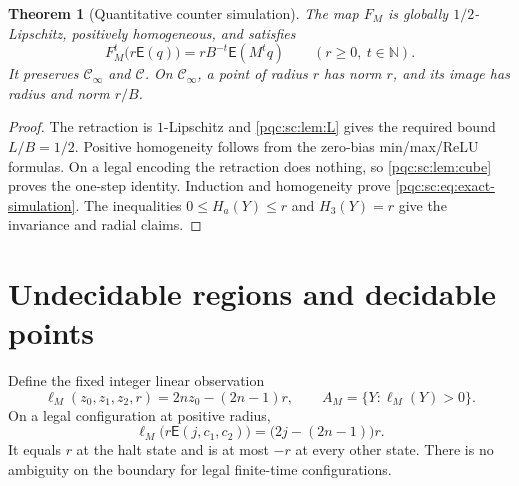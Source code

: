 \documentclass[11pt,letterpaper]{article}
\numberwithin{equation}{section}
\newtheorem{theorem}{Theorem}[section]
\theoremstyle{definition}
\theoremstyle{remark}
\newcommand{\N}{\mathbb N}
\newcommand{\srcmark}[1]{\par\noindent{\small\itshape [source~#1]}\par}
\newcommand{\Cone}{\mathcal C}
\newcommand{\Cinf}{\mathcal C_{\infty}}
\newcommand{\Enc}{\mathsf E}
\begin{document}
\begin{theorem}[Quantitative counter simulation]\label{pqc:sc:thm:counter}
The map $F_M$ is globally $1/2$-Lipschitz, positively homogeneous, and
satisfies
\begin{equation}\label{pqc:sc:eq:exact-simulation}
 F_M^t\bigl(r\Enc(q)\bigr)=rB^{-t}\Enc(M^tq)
 \qquad(r\ge0,\ t\in\N).
\end{equation}
It preserves $\Cinf$ and $\Cone$. On $\Cinf$, a point of radius $r$ has
norm $r$, and its image has radius and norm $r/B$.
\end{theorem}
\begin{proof}
The retraction is $1$-Lipschitz and \cref{pqc:sc:lem:L} gives the required bound
$L/B=1/2$. Positive homogeneity follows from the zero-bias min/max/ReLU
formulas. On a legal encoding the retraction does nothing, so
\cref{pqc:sc:lem:cube} proves the one-step identity. Induction and homogeneity
prove \eqref{pqc:sc:eq:exact-simulation}. The inequalities $0\le H_a(Y)\le r$
and $H_3(Y)=r$ give the invariance and radial claims.
\end{proof}

\section{Undecidable regions and decidable points}\label{pqc:sc:sec:observations}
\srcmark{14}

Define the fixed integer linear observation
\begin{equation}\label{pqc:sc:eq:ell}
 \ell_M(z_0,z_1,z_2,r)=2nz_0-(2n-1)r,
 \qquad A_M=\{Y:\ell_M(Y)>0\}.
\end{equation}
On a legal configuration at positive radius,
\begin{equation}\label{pqc:sc:eq:signal}
 \ell_M\bigl(r\Enc(j,c_1,c_2)\bigr)
       =\bigl(2j-(2n-1)\bigr)r.
\end{equation}
It equals $r$ at the halt state and is at most $-r$ at every other state.
There is no ambiguity on the boundary for legal finite-time configurations.
\end{document}
